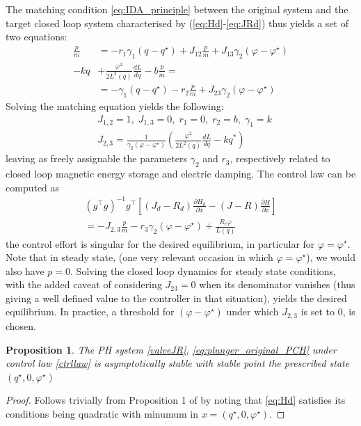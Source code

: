 \documentclass[letterpaper, 10pt, conference]{ieeeconf}
\newtheorem{proposition}{Proposition}
\begin{document}
The matching condition \eqref{eq:IDA_principle} between the original system and the target closed loop system characterised by (\ref{eq:Hd}-\ref{eq:JRd}) thus yields a set of two equations:
\begin{equation}
    \begin{aligned}
        \frac{p}{m} &= -r_{1} \gamma_{1}(q-q^\star) + J_{12} \frac{p}{m} + J_{13}\gamma_{2}(\varphi - \varphi^\star)     \\ 
        -kq  &+ \frac{\varphi^2}{2L^2(q)} \frac{dL}{dq} - b\frac{p}{m} = \\ &=-\gamma_{1}(q-q^\star) - r_{2} \frac{p}{m} + J_{23}\gamma_{2} (\varphi-\varphi^\star)
    \end{aligned}
\end{equation}
Solving the matching equation yields the following:
\begin{equation}
    \begin{aligned}
    &J_{1,2}=1, \; J_{1,3}=0, \; r_1=0, \; r_2=b, \; \gamma_1=k\\
    &J_{2,3}=\frac{1}{\gamma_{2}(\varphi-\varphi^\star)} \left(\frac{\varphi^2}{2L^2(q)} \frac{dL}{dq}-kq^*\right)
    \end{aligned}
\end{equation}
leaving as freely assignable the parameters $\gamma_2$ and $r_3$, respectively related to closed loop magnetic energy storage and electric damping. The control law can be computed as 
\begin{equation}\label{ctrllaw}
    \begin{multlined}
        (g^\top g)^{-1}g^\top \left[ (J_{d}-R_{d}) \frac{\partial H_{d}}{\partial x} - (J-R) \frac{\partial H}{\partial x} \right] \\
        = -J_{2,3} \frac{p}{m} -r_{3}\gamma_{2}(\varphi -\varphi^\star) + \frac{R_{c}\varphi}{L(q)}
    \end{multlined}
\end{equation}
the control effort is singular for the desired equilibrium, in particular for $\varphi = \varphi^\star$. Note that in steady state, (one very relevant occasion in which $\varphi=\varphi^\star$), we would also have $p=0$. Solving the closed loop dynamics for steady state conditions, with the added caveat of considering $J_{23}=0$ when its denominator vanishes (thus giving a well defined value to the controller in that situation), yields the desired equilibrium. In practice, a threshold for $(\varphi-\varphi^\star)$ under which $J_{2,3}$ is set to 0, is chosen.
\begin{proposition}
The PH system \eqref{valveJR}, \eqref{eq:plunger_original_PCH} under control law \eqref{ctrllaw} is asymptotically stable with stable point the prescribed state $(q^\star,0,\varphi^\star)$
\end{proposition}
\begin{proof}
Follows trivially from Proposition 1 of \cite{IDAPBC} by noting that \eqref{eq:Hd} satisfies its conditions being quadratic with minumum in $x = (q^\star,0,\varphi^\star)$.
\end{proof}
\end{document}
